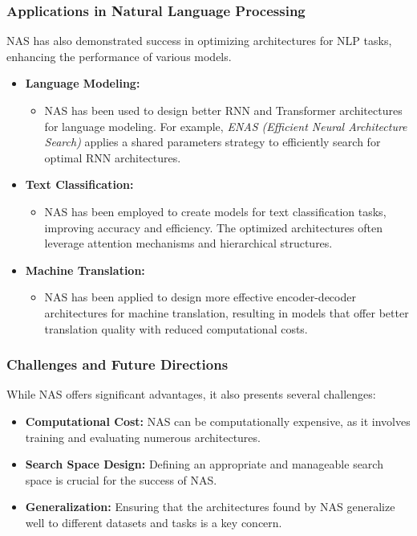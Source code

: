 \documentclass[12pt]{article}
\begin{document}
\subsubsection{Applications in Natural Language Processing}
NAS has also demonstrated success in optimizing architectures for NLP tasks, enhancing the performance of various models.
\begin{itemize}
    \item \textbf{Language Modeling:}
    \begin{itemize}
        \item NAS has been used to design better RNN and Transformer architectures for language modeling. For example, \textit{ENAS (Efficient Neural Architecture Search)} applies a shared parameters strategy to efficiently search for optimal RNN architectures.
    \end{itemize}
    \item \textbf{Text Classification:}
    \begin{itemize}
        \item NAS has been employed to create models for text classification tasks, improving accuracy and efficiency. The optimized architectures often leverage attention mechanisms and hierarchical structures.
    \end{itemize}
    \item \textbf{Machine Translation:}
    \begin{itemize}
        \item NAS has been applied to design more effective encoder-decoder architectures for machine translation, resulting in models that offer better translation quality with reduced computational costs.
    \end{itemize}
\end{itemize}

\subsubsection{Challenges and Future Directions}
While NAS offers significant advantages, it also presents several challenges:
\begin{itemize}
    \item \textbf{Computational Cost:} NAS can be computationally expensive, as it involves training and evaluating numerous architectures.
    \item \textbf{Search Space Design:} Defining an appropriate and manageable search space is crucial for the success of NAS.
    \item \textbf{Generalization:} Ensuring that the architectures found by NAS generalize well to different datasets and tasks is a key concern.
\end{itemize}
\end{document}
